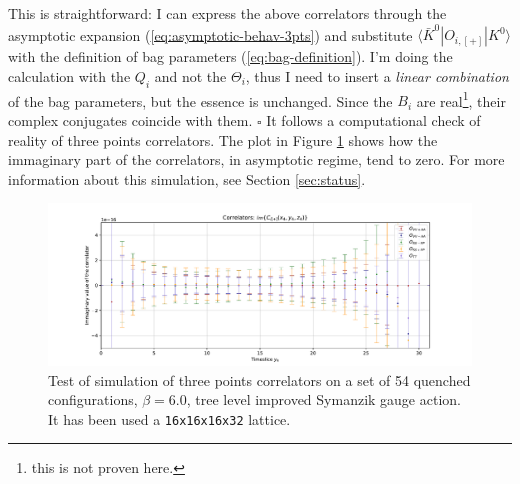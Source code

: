 \documentclass[english, LaM, oneside, noexaminfo]{sapthesis}
\newcommand{\la}{\langle}
\newcommand{\ra}{\rangle}
\newcommand{\proved}{\newline \hspace*{.97\textwidth} $\square$}
\begin{document}
This is straightforward: I can express the above correlators through the asymptotic expansion (\ref{eq:asymptotic-behav-3pts}) and substitute $\la \bar K^0 | O_{i,[+]} | K^0 \ra$ with the definition of bag parameters (\ref{eq:bag-definition}).
I'm doing the calculation with the $Q_i$ and not the $\Theta_i$, thus I need to insert a {\it linear combination} of the bag parameters, but the essence is unchanged.
Since the $B_i$ are real\footnote{this is not proven here.}, their complex conjugates coincide with them.
\proved
\newline
It follows a computational check of reality of three points correlators.
The plot in Figure \ref{fig:reality3pts} shows how the immaginary part of the correlators, in asymptotic regime, tend to zero.
For more information about this simulation, see Section \ref{sec:status}.
\begin{figure}[h!]
    \centering
    \includegraphics[width=\textwidth]{imgs-MSc-thesis/pureYM-immaginary.pdf}
    \caption{Test of simulation of three points correlators on a set of 54 quenched configurations, $\beta = 6.0$, tree level improved Symanzik gauge action.
        It has been used a \texttt{16x16x16x32} lattice.}
    \label{fig:reality3pts}
\end{figure}
\end{document}
